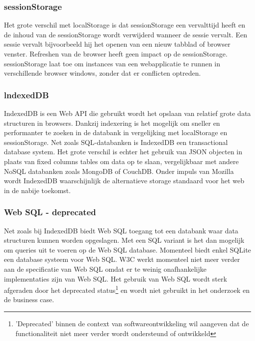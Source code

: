 \subsubsection{sessionStorage}
Het grote verschil \autocite{mozilla-overview} met localStorage is dat sessionStorage een vervalttijd heeft en de inhoud van de sessionStorage wordt verwijderd wanneer de sessie vervalt. Een sessie vervalt bijvoorbeeld hij het openen van een nieuw tabblad of browser venster. Refreshen van de browser heeft geen impact op de sessionStorage. sessionStorage laat toe om instances van een webapplicatie te runnen in verschillende browser windows, zonder dat er conflicten optreden.
\subsubsection{lndexedDB}
IndexedDB \autocite{indexeddb-moz} is een Web API die gebruikt wordt het opslaan van relatief grote data structuren in browsers. Dankzij indexering is het mogelijk om sneller en performanter \autocite{clientside-storage} te zoeken in de databank in vergelijking met localStorage en sessionStorage. Net zoals SQL-databanken is IndexedDB een transactional database system. Het grote verschil is echter het gebruik van JSON objecten in plaats van fixed columns tables om data op te slaan, vergelijkbaar met andere NoSQL databanken zoals MongoDB of CouchDB. Onder impuls van Mozilla wordt IndexedDB waarschijnlijk de alternatieve storage standaard voor het web in de nabije toekomst.
\subsubsection{Web SQL - deprecated}
Net zoals bij IndexedDB biedt Web SQL toegang tot een databank waar data structuren kunnen worden opgeslagen. Met een SQL variant is het dan mogelijk om queries uit te voeren op de Web SQL database. Momenteel biedt enkel SQLite een database systeem voor Web SQL. W3C werkt momenteel niet meer verder aan de specificatie \autocite{websql-specification} van Web SQL omdat er te weinig onafhankelijke implementaties zijn van Web SQL. Het gebruik van Web SQL wordt sterk afgeraden door het deprecated status\footnote{'Deprecated' binnen de context van softwareontwikkeling wil aangeven dat de functionaliteit niet meer verder wordt ondersteund of ontwikkeld} en wordt niet gebruikt in het onderzoek en de business case.
\clearpage
